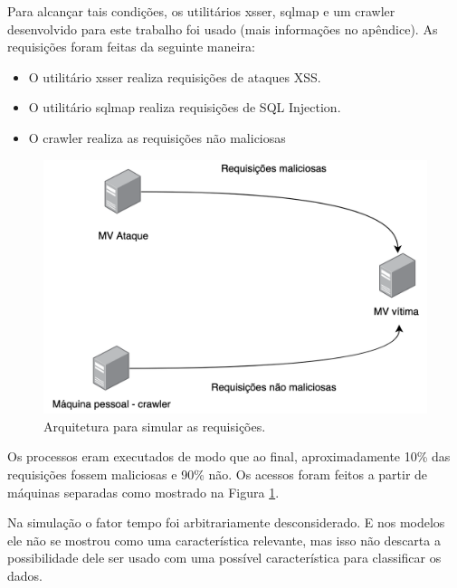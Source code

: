 Para alcançar tais condições, os utilitários xsser, sqlmap e um crawler desenvolvido para 
este trabalho foi usado (mais informações no apêndice). As requisições foram feitas da seguinte maneira:

\begin{itemize}
    \item O utilitário xsser realiza requisições de ataques XSS.
    \item O utilitário sqlmap realiza requisições de SQL Injection.
    \item O crawler realiza as requisições não maliciosas
\end{itemize}

\begin{figure}
    \centering
    \includegraphics[width=.7\textwidth]{figuras/arquitetura_ataque.png}
    \caption{Arquitetura para simular as requisições. \label{fig:arquitetura_ataque}}    
\end{figure}

Os processos eram executados de modo que ao final, aproximadamente 10\% das requisições 
fossem maliciosas e 90\% não. Os acessos foram feitos a partir de máquinas separadas como 
mostrado na Figura \ref{fig:arquitetura_ataque}.

Na simulação o fator tempo foi arbitrariamente desconsiderado. E nos modelos ele não se mostrou 
como uma característica relevante, mas isso não descarta a possibilidade dele ser usado com uma possível
característica para classificar os dados.

